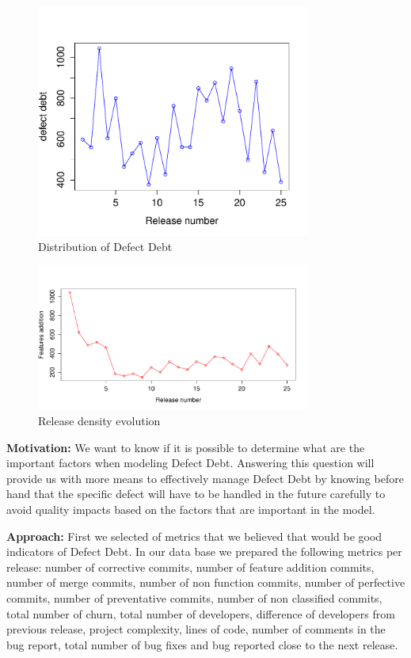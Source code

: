 \begin{figure}[thb!]
	\caption{Distribution of Defect Debt}
	\label{fig:technical_debt}
	\includegraphics[width=90mm,scale=0.5]{figures/technical_debt}
\end{figure}

\begin{figure}[thb!]
    \caption{Release density evolution}
    \label{fig:feature_addition_releases}
    \includegraphics[width=90mm,scale=0.5]{figures/feature_addition_releases}
\end{figure}

\vspace{3mm}
\noindent\rqiii
\vspace{3mm}

\noindent\textbf{Motivation:} We want to know if it is possible to determine what are the important factors when modeling Defect Debt. Answering this question will provide us with more means to effectively manage Defect Debt by knowing before hand that the specific defect will have to be handled in the future carefully to avoid quality impacts based on the factors that are important in the model. 

\vspace{1mm}
\noindent\textbf{Approach:} First we selected  of metrics that we believed that would be good indicators of Defect Debt. In our data base we prepared the following metrics per release: number of corrective commits, number of feature addition commits, number of merge commits, number of non function commits, number of perfective commits, number of preventative commits, number of non classified commits, total number of churn, total number of developers, difference of developers from previous release, project complexity, lines of code, number of comments in the bug report, total number of bug fixes and bug reported close to the next release.

